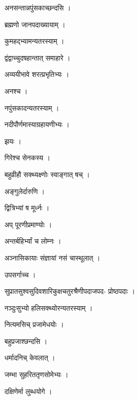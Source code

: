 \documentclass[10pt, openany]{book}
\begin{document}
\noindent अनसन्तान्नपुंसकाच्छन्दसि ।

\noindent ब्रह्मणो जानपदाख्यायाम् ।

\noindent कुमहद्भ्यामन्यतरस्याम् ।

\noindent द्वंद्वाच्चुदषहान्तात् समाहारे ।

\noindent अव्ययीभावे शरत्प्रभृतिभ्यः ।

\noindent अनश्च ।

\noindent नपुंसकादन्यतरस्याम् ।

\noindent नदीपौर्णमास्याग्रहायणीभ्यः ।

\noindent झयः ।

\noindent गिरेश्च सेनकस्य ।

\noindent बहुव्रीहौ सक्थ्यक्ष्णोः स्वाङ्गात् षच् ।

\noindent अङ्गुलेर्दारुणि ।

\noindent द्वित्रिभ्यां ष मूर्ध्नः ।

\noindent अप् पूरणीप्रमाण्योः ।

\noindent अन्तर्बहिर्भ्यां च लोम्नः ।

\noindent अञ्नासिकायाः संज्ञायां नसं चास्थूलात् ।

\noindent उपसर्गाच्च ।

\noindent सुप्रातसुश्वसुदिवशारिकुक्षचतुरश्रैणीपदाजपद- प्रोष्ठपदाः ।

\noindent नञ्दुःसुभ्यो हलिसक्थ्योरन्यतरस्याम् ।

\noindent नित्यमसिच् प्रजामेधयोः ।

\noindent बहुप्रजाश्छन्दसि ।

\noindent धर्मादनिच् केवलात् ।

\noindent जम्भा सुहरिततृणसोमेभ्यः ।

\noindent दक्षिणेर्मा लुब्धयोगे ।
\end{document}
